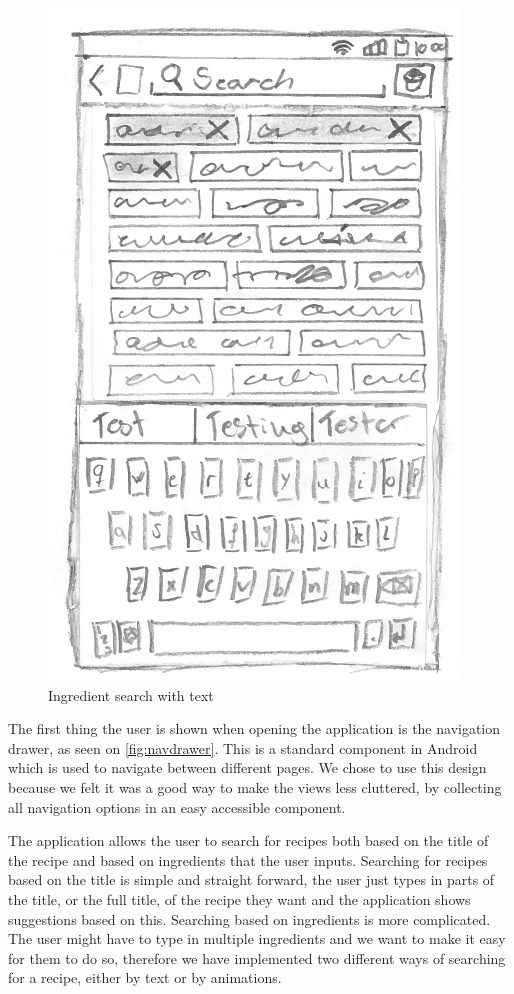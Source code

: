 \begin{figure}[H]
\begin{minipage}[b]{0.5\columnwidth}
\includegraphics[width=0.7\columnwidth]{img/prototypes/ingredient_search_text.pdf}
\caption{Ingredient search with text\label{fig:ingretext}}
\end{minipage}
\end{figure}

The first thing the user is shown when opening the application is the navigation drawer, as seen on \autoref{fig:navdrawer}. This is a standard component in Android which is used to navigate between different pages. We chose to use this design because we felt it was a good way to make the views less cluttered, by collecting all navigation options in an easy accessible component. 

The application allows the user to search for recipes both based on the title of the recipe and based on ingredients that the user inputs. Searching for recipes based on the title is simple and straight forward, the user just types in parts of the title, or the full title, of the recipe they want and the application shows suggestions based on this. Searching based on ingredients is more complicated. The user might have to type in multiple ingredients and we want to make it easy for them to do so, therefore we have implemented two different ways of searching for a recipe, either by text or by animations.

